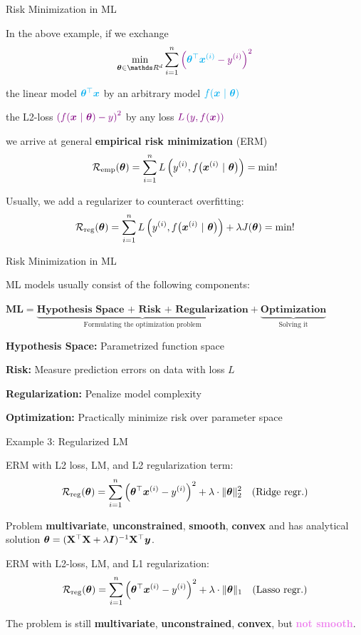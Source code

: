 \documentclass[11pt,compress,t,notes=noshow, xcolor=table]{beamer}
\begin{document}
\begin{framei}{Risk Minimization in ML}
\item In the above example, if we exchange
$$ \min_{\thetav \in \R^d} \sum_{i = 1}^n \textcolor{violet}{\left(\textcolor{cyan}{\thetav^\top \xi} - \yi\right)^2} $$
\item the linear model $\textcolor{cyan}{\bm{\theta}^\top \bm{x}}$ by an arbitrary model $\textcolor{cyan}{f(\bm{x} ~|~ \bm{\theta})}$
\item the L2-loss $\textcolor{violet}{\left(f(\bm{x} ~|~ \bm{\theta}) - y\right)^2}$ by any loss $\textcolor{violet}{L\left(y, f(\bm{x})\right)}$
\item we arrive at general \textbf{empirical risk minimization} (ERM)
$$ \mathcal{R}_{\text{emp}}(\bm{\theta}) = \sum\limits_{i=1}^n L\left(y^{(i)}, f\big(\bm{x}^{(i)} ~|~ \bm{\theta}\big)\right) = \textrm{min}! $$
\item Usually, we add a regularizer to counteract overfitting:
$$ \mathcal{R}_{\text{reg}}(\bm{\theta}) =  \sum\limits_{i=1}^n L\left(y^{(i)}, f\big(\bm{x}^{(i)} ~|~ \bm{\theta}\big)\right) + \lambda J(\bm{\theta}) = \textrm{min}! $$
\end{framei}


\begin{framei}[sep=L]{Risk Minimization in ML}
\item ML models usually consist of the following components:\\
\begin{small}$\textbf{ML} = \underbrace{\textbf{Hypothesis Space + Risk + Regularization}}_{\text{Formulating the optimization problem}} + \underbrace{\textbf{Optimization}}_{\text{Solving it}}$\end{small}
\item \textbf{Hypothesis Space:} Parametrized function space
\item \textbf{Risk:} Measure prediction errors on data with loss $L$
\item \textbf{Regularization:} Penalize model complexity
\item \textbf{Optimization:} Practically minimize risk over parameter space
\end{framei}


\begin{framei}[fs=footnotesize]{Example 3: Regularized LM}
\item ERM with L2 loss, LM, and L2 regularization term:
$$ \mathcal{R}_{\text{reg}}(\bm{\theta}) = \sum\limits_{i=1}^n \left(\bm{\theta}^\top \bm{x}^{(i)} - y^{(i)}\right)^2  + \lambda \cdot \|\bm{\theta}\|_2^2 \quad \text{(Ridge regr.)} $$
\item Problem \textbf{multivariate}, \textbf{unconstrained}, \textbf{smooth}, \textbf{convex} and has analytical solution $\bm{\theta} = (\mathbf{X}^\top \mathbf{X} + \lambda \bm{I})^{-1}\mathbf{X}^\top \bm{y}$.
\item ERM with L2-loss, LM, and L1 regularization:
$$ \mathcal{R}_{\text{reg}}(\bm{\theta}) = \sum\limits_{i=1}^n \left(\bm{\theta}^\top \bm{x}^{(i)} - y^{(i)}\right)^2  + \lambda \cdot \|\bm{\theta}\|_1 \quad \text{(Lasso regr.)} $$
\item The problem is still \textbf{multivariate}, \textbf{unconstrained}, \textbf{convex}, but \textcolor{violet}{\textbf{not smooth}}.
\vfill
{}
\end{framei}
\end{document}

